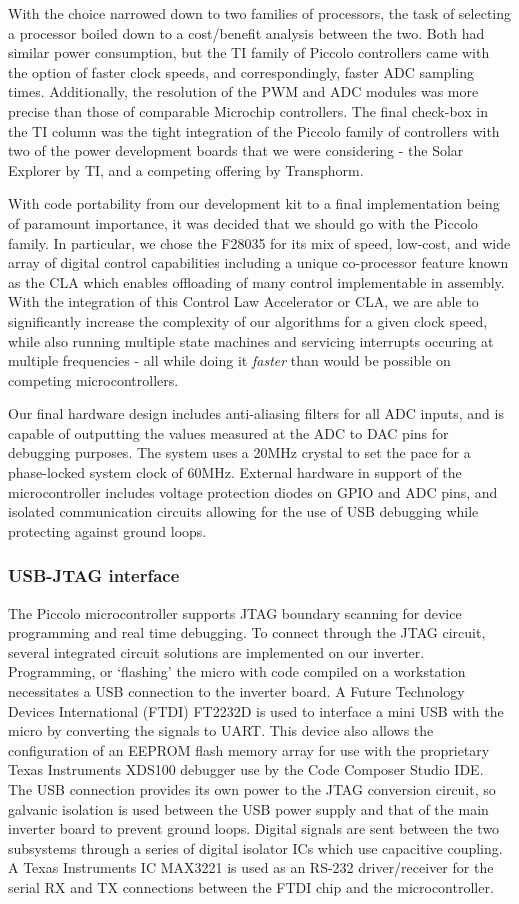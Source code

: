 With the choice narrowed down to two families of processors, the task of selecting a processor boiled down to a cost/benefit analysis between the two. Both had similar power consumption, but the TI family of Piccolo controllers came with the option of faster clock speeds, and correspondingly, faster ADC sampling times. Additionally, the resolution of the PWM and ADC modules was more precise than those of comparable Microchip controllers. The final check-box in the TI column was the tight integration of the Piccolo family of controllers with two of the power development boards that we were considering - the Solar Explorer by TI, and a competing offering by Transphorm. 

With code portability from our development kit to a final implementation being of paramount importance, it was decided that we should go with the Piccolo family. In particular, we chose the F28035 for its mix of speed, low-cost, and wide array of digital control capabilities including a unique co-processor feature known as the CLA which enables offloading of many control implementable in assembly. With the integration of this Control Law Accelerator or CLA, we are able to significantly increase the complexity of our algorithms for a given clock speed, while also running multiple state machines and servicing interrupts occuring at multiple frequencies - all while doing it \emph{faster} than would be possible on competing microcontrollers.

Our final hardware design includes anti-aliasing filters for all ADC inputs, and is capable of outputting the values measured at the ADC to DAC pins for debugging purposes. The system uses a 20MHz crystal to set the pace for a phase-locked system clock of 60MHz. External hardware in support of the microcontroller includes voltage protection diodes on GPIO and ADC pins, and isolated communication circuits allowing for the use of USB debugging while protecting against ground loops.

\subsubsection{USB-JTAG interface}
The Piccolo microcontroller supports JTAG boundary scanning for device programming and real time debugging. To connect through the JTAG circuit, several integrated circuit solutions are implemented on our inverter. Programming, or 
`flashing' the micro with code compiled on a workstation necessitates a USB connection to the inverter board. A Future Technology Devices International (FTDI) FT2232D is used to interface a mini USB with the micro by converting the signals to UART. This device also allows the configuration of an EEPROM flash memory array for use with the proprietary Texas Instruments XDS100 debugger use by the Code Composer Studio IDE. The USB connection provides its own power to the JTAG conversion circuit, so galvanic isolation is used between the USB power supply and that of the main inverter board to prevent ground loops. Digital signals are sent between the two subsystems through a series of digital isolator ICs which use capacitive coupling. A Texas Instruments IC MAX3221 is used as an RS-232 driver/receiver for the serial RX and TX connections between the FTDI chip and the microcontroller.

